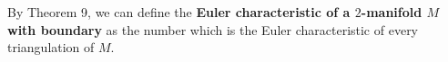 By Theorem 9, we can define the \textbf{Euler characteristic of a $2$-manifold $M$ with boundary} as the number which is the Euler characteristic of every triangulation of $M$.

